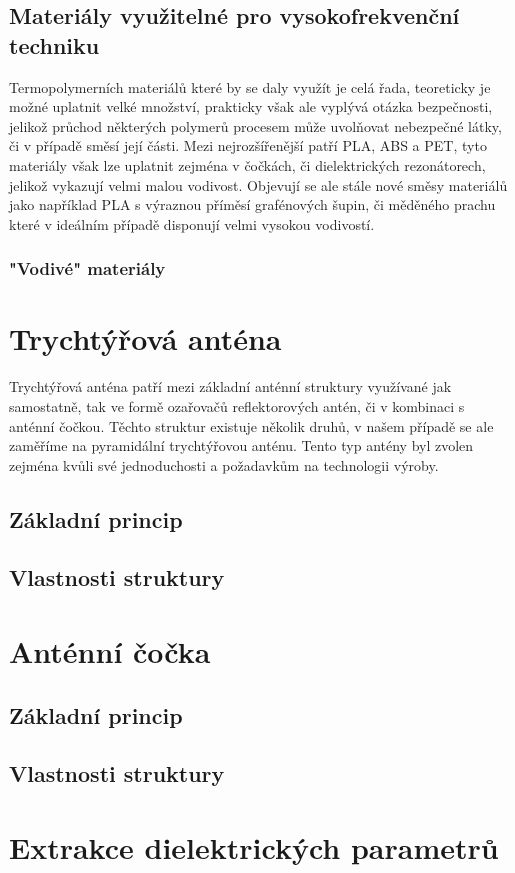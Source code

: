 \subsection{Materiály využitelné pro vysokofrekvenční techniku}
Termopolymerních materiálů které by se daly využít je celá řada, teoreticky je možné uplatnit velké množství, prakticky však ale vyplývá otázka bezpečnosti, jelikož průchod některých polymerů procesem může uvolňovat nebezpečné látky, či v případě směsí její části.
Mezi nejrozšířenější patří PLA, ABS a PET, tyto materiály však lze uplatnit zejména v čočkách, či dielektrických rezonátorech, jelikož vykazují velmi malou vodivost. Objevují se ale stále nové směsy materiálů jako například PLA s výraznou příměsí grafénových šupin, či měděného prachu které v ideálním případě disponují velmi vysokou vodivostí.

\subsubsection{"Vodivé" materiály}



\section{Trychtýřová anténa}
Trychtýřová anténa patří mezi základní anténní struktury využívané jak samostatně, tak ve formě ozařovačů reflektorových antén, či v kombinaci s anténní čočkou. Těchto struktur existuje několik druhů, v našem případě se ale zaměříme na pyramidální trychtýřovou anténu.
Tento typ antény byl zvolen zejména kvůli své jednoduchosti a požadavkům na technologii výroby.

\subsection{Základní princip}
\subsection{Vlastnosti struktury}


\section{Anténní čočka}

\subsection{Základní princip}
\subsection{Vlastnosti struktury}




\section{Extrakce dielektrických parametrů}